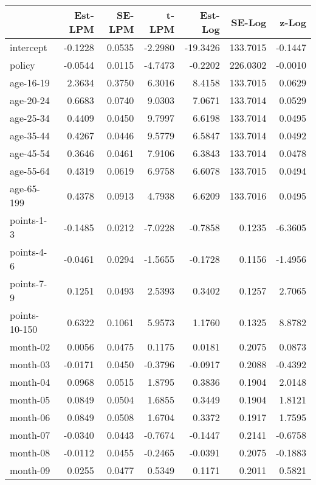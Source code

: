 \documentclass[10pt]{article}
\begin{document}
\begin{table}[ht]
\centering
\begin{tabular}{lrrrrrr}
  \hline
 & Est-LPM & SE-LPM & t-LPM & Est-Log & SE-Log & z-Log \\ 
  \hline
intercept & -0.1228 & 0.0535 & -2.2980 & -19.3426 & 133.7015 & -0.1447 \\ 
  policy & -0.0544 & 0.0115 & -4.7473 & -0.2202 & 226.0302 & -0.0010 \\ 
  age-16-19 & 2.3634 & 0.3750 & 6.3016 & 8.4158 & 133.7015 & 0.0629 \\ 
  age-20-24 & 0.6683 & 0.0740 & 9.0303 & 7.0671 & 133.7014 & 0.0529 \\ 
  age-25-34 & 0.4409 & 0.0450 & 9.7997 & 6.6198 & 133.7014 & 0.0495 \\ 
  age-35-44 & 0.4267 & 0.0446 & 9.5779 & 6.5847 & 133.7014 & 0.0492 \\ 
  age-45-54 & 0.3646 & 0.0461 & 7.9106 & 6.3843 & 133.7014 & 0.0478 \\ 
  age-55-64 & 0.4319 & 0.0619 & 6.9758 & 6.6078 & 133.7015 & 0.0494 \\ 
  age-65-199 & 0.4378 & 0.0913 & 4.7938 & 6.6209 & 133.7016 & 0.0495 \\ 
  points-1-3 & -0.1485 & 0.0212 & -7.0228 & -0.7858 & 0.1235 & -6.3605 \\ 
  points-4-6 & -0.0461 & 0.0294 & -1.5655 & -0.1728 & 0.1156 & -1.4956 \\ 
  points-7-9 & 0.1251 & 0.0493 & 2.5393 & 0.3402 & 0.1257 & 2.7065 \\ 
  points-10-150 & 0.6322 & 0.1061 & 5.9573 & 1.1760 & 0.1325 & 8.8782 \\ 
  month-02 & 0.0056 & 0.0475 & 0.1175 & 0.0181 & 0.2075 & 0.0873 \\ 
  month-03 & -0.0171 & 0.0450 & -0.3796 & -0.0917 & 0.2088 & -0.4392 \\ 
  month-04 & 0.0968 & 0.0515 & 1.8795 & 0.3836 & 0.1904 & 2.0148 \\ 
  month-05 & 0.0849 & 0.0504 & 1.6855 & 0.3449 & 0.1904 & 1.8121 \\ 
  month-06 & 0.0849 & 0.0508 & 1.6704 & 0.3372 & 0.1917 & 1.7595 \\ 
  month-07 & -0.0340 & 0.0443 & -0.7674 & -0.1447 & 0.2141 & -0.6758 \\ 
  month-08 & -0.0112 & 0.0455 & -0.2465 & -0.0391 & 0.2075 & -0.1883 \\ 
  month-09 & 0.0255 & 0.0477 & 0.5349 & 0.1171 & 0.2011 & 0.5821 \\ 

\end{tabular}
\end{table}
\end{document}
